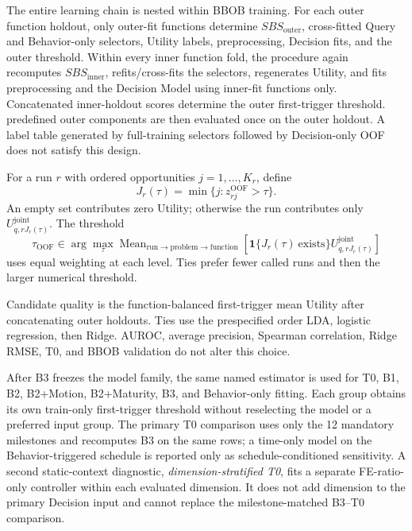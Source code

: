 The entire learning chain is nested within BBOB training.  For each outer
function holdout, only outer-fit functions determine $SBS_{\mathrm{outer}}$,
cross-fitted Query and Behavior-only selectors, Utility labels, preprocessing,
Decision fits, and the outer threshold.  Within every inner function fold, the
procedure again recomputes $SBS_{\mathrm{inner}}$, refits/cross-fits the
selectors, regenerates Utility, and fits preprocessing and the Decision Model
using inner-fit functions only.  Concatenated inner-holdout scores determine the
outer first-trigger threshold.  predefined outer components are then evaluated once
on the outer holdout.  A label table generated by full-training selectors
followed by Decision-only OOF does not satisfy this design.

For a run $r$ with ordered opportunities $j=1,\ldots,K_r$, define
\begin{equation}
  J_r(\tau)=\min\{j:z_{rj}^{\mathrm{OOF}}>\tau\}.
  \label{eq:first-trigger-index}
\end{equation}
An empty set contributes zero Utility; otherwise the run contributes only
$U_{q,rJ_r(\tau)}^{\mathrm{joint}}$.  The threshold
\begin{equation}
  \tau_{\mathrm{OOF}}
  \in\arg\max_{\tau}
  \operatorname{Mean}_{\mathrm{run}\rightarrow\mathrm{problem}\rightarrow\mathrm{function}}
  \!\left[
  \mathbf{1}\{J_r(\tau)\ \mathrm{exists}\}
  U_{q,rJ_r(\tau)}^{\mathrm{joint}}
  \right]
  \label{eq:oof-threshold}
\end{equation}
uses equal weighting at each level.  Ties prefer fewer called runs and then the
larger numerical threshold.

Candidate quality is the function-balanced first-trigger mean Utility after
concatenating outer holdouts.  Ties use the prespecified order LDA, logistic
regression, then Ridge.  AUROC, average precision, Spearman correlation, Ridge
RMSE, T0, and BBOB validation do not alter this choice.

After B3 freezes the model family, the same named estimator is used for T0, B1,
B2, B2+Motion, B2+Maturity, B3, and Behavior-only fitting.  Each group obtains
its own train-only first-trigger threshold without reselecting the model or a
preferred input group.  The primary T0 comparison uses only the 12 mandatory
milestones and recomputes B3 on the same rows; a time-only model on the
Behavior-triggered schedule is reported only as schedule-conditioned
sensitivity.  A second static-context diagnostic, \emph{dimension-stratified
T0}, fits a separate FE-ratio-only controller within each evaluated dimension.
It does not add dimension to the primary Decision input and cannot replace the
milestone-matched B3--T0 comparison.

